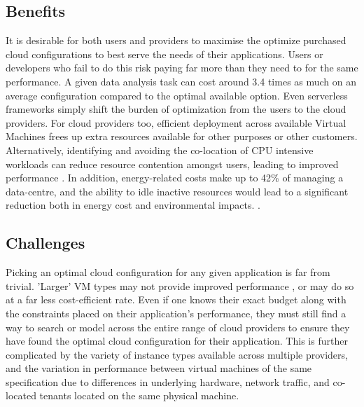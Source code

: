 \documentclass{report}
\begin{document}
\subsection{Benefits}
It is desirable for both users and providers to maximise the optimize purchased cloud configurations to best serve the needs of their applications. Users or developers who fail to do this risk paying far more than they need to for the same performance. A given data analysis task can cost around 3.4 times as much on an average configuration compared to the optimal available option\cite{Alipourfard2017}. Even serverless frameworks simply shift the burden of optimization from the users to the cloud providers. For cloud providers too, efficient deployment across available Virtual Machines frees up extra resources available for other purposes or other customers. Alternatively, identifying and avoiding the co-location of CPU intensive workloads can reduce resource contention amongst users, leading to improved performance \cite{Pu2010}. In addition, energy-related costs make up to 42\% of managing a data-centre, and the ability to idle inactive resources would lead to a significant reduction both in energy cost and environmental impacts. \cite{Berl2010, Gkatzikis2013}. 

\subsection{Challenges}
Picking an optimal cloud configuration for any given application is far from trivial. 'Larger' VM types may not provide improved performance \cite{Yadwadkar2017}, or may do so at a far less cost-efficient rate. Even if one knows their exact budget along with the constraints placed on their application's performance, they must still find a way to search or model across the entire range of cloud providers to ensure they have found the optimal cloud configuration for their application. This is further complicated by the variety of instance types available across multiple providers, and the variation in performance between virtual machines of the same specification due to differences in underlying hardware, network traffic, and co-located tenants located on the same physical machine.
\end{document}

